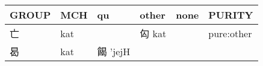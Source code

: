 \documentclass[14pt,a4paper]{scrartcl}
\begin{document}
\begin{longtable}[c]{@{}llllll@{}}
\toprule
\begin{minipage}[b]{0.14\columnwidth}\raggedright\strut
GROUP
\strut\end{minipage} &
\begin{minipage}[b]{0.14\columnwidth}\raggedright\strut
MCH
\strut\end{minipage} &
\begin{minipage}[b]{0.14\columnwidth}\raggedright\strut
qu
\strut\end{minipage} &
\begin{minipage}[b]{0.14\columnwidth}\raggedright\strut
other
\strut\end{minipage} &
\begin{minipage}[b]{0.14\columnwidth}\raggedright\strut
none
\strut\end{minipage} &
\begin{minipage}[b]{0.14\columnwidth}\raggedright\strut
PURITY
\strut\end{minipage}\tabularnewline
\midrule
\endhead
\begin{minipage}[t]{0.14\columnwidth}\raggedright\strut
亡
\strut\end{minipage} &
\begin{minipage}[t]{0.14\columnwidth}\raggedright\strut
kat
\strut\end{minipage} &
\begin{minipage}[t]{0.14\columnwidth}\raggedright\strut
\strut\end{minipage} &
\begin{minipage}[t]{0.14\columnwidth}\raggedright\strut
匃 kat
\strut\end{minipage} &
\begin{minipage}[t]{0.14\columnwidth}\raggedright\strut
\strut\end{minipage} &
\begin{minipage}[t]{0.14\columnwidth}\raggedright\strut
pure:other
\strut\end{minipage}\tabularnewline
\begin{minipage}[t]{0.14\columnwidth}\raggedright\strut
曷
\strut\end{minipage} &
\begin{minipage}[t]{0.14\columnwidth}\raggedright\strut
kat
\strut\end{minipage} &
\begin{minipage}[t]{0.14\columnwidth}\raggedright\strut
餲 'jejH
\strut\end{minipage} &
\begin{minipage}[t]{0.14\columnwidth}\raggedright\strut

\end{minipage}
\end{longtable}
\end{document}
